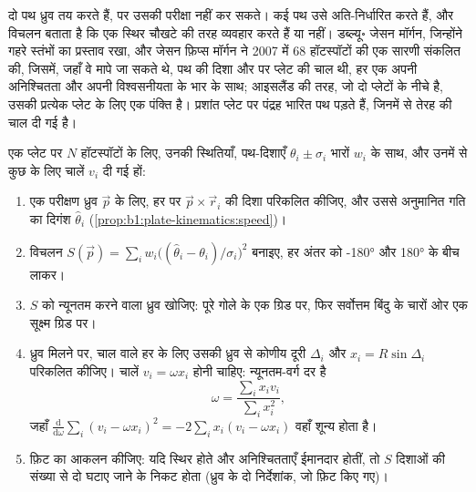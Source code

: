 दो पथ ध्रुव तय करते हैं, पर उसकी परीक्षा नहीं कर सकते। कई पथ उसे अति-निर्धारित करते हैं, और विचलन बताता है कि  एक स्थिर चौखटे की तरह व्यवहार करते हैं या नहीं। डब्ल्यू॰ जेसन मॉर्गन, जिन्होंने गहरे स्तंभों का प्रस्ताव रखा, और जेसन फ़िप्स मॉर्गन ने 2007 में 68 हॉटस्पॉटों की एक सारणी संकलित की, जिसमें, जहाँ वे मापे जा सकते थे, पथ की दिशा और  पर प्लेट की चाल थी, हर एक अपनी अनिश्चितता और अपनी विश्वसनीयता के भार के साथ; आइसलैंड की तरह, जो दो प्लेटों के नीचे है, उसकी प्रत्येक प्लेट के लिए एक पंक्ति है। प्रशांत प्लेट पर पंद्रह भारित पथ पड़ते हैं, जिनमें से तेरह की चाल दी गई है।

\begin{method}[हॉटस्पॉट-पथों से यूलर ध्रुव और दर का अनुमान]
\label{met:b1:hotspots:pole-fit}
एक प्लेट पर $N$ हॉटस्पॉटों के लिए, उनकी स्थितियाँ, पथ-दिशाएँ $\theta_i \pm \sigma_i$ भारों $w_i$ के साथ, और उनमें से कुछ के लिए चालें $v_i$ दी गई हों:
\begin{enumerate}
  \item एक परीक्षण ध्रुव $\vec p$ के लिए, हर  पर $\vec p\times\vec r_i$ की दिशा परिकलित कीजिए, और उससे अनुमानित गति का दिगंश $\hat\theta_i$ (\cref{prop:b1:plate-kinematics:speed})।
  \item विचलन $S(\vec p) = \sum_i w_i\bigl((\hat\theta_i -
        \theta_i)/\sigma_i\bigr)^2$ बनाइए, हर अंतर को \ang{-180} और \ang{180} के बीच लाकर।
  \item $S$ को न्यूनतम करने वाला ध्रुव खोजिए: पूरे गोले के एक ग्रिड पर, फिर सर्वोत्तम बिंदु के चारों ओर एक सूक्ष्म ग्रिड पर।
  \item ध्रुव मिलने पर, चाल वाले हर  के लिए उसकी ध्रुव से कोणीय दूरी $\Delta_i$ और $x_i = R\sin\Delta_i$ परिकलित कीजिए। चालें $v_i = \omega x_i$ होनी चाहिए: न्यूनतम-वर्ग दर है
        \[
          \omega = \frac{\sum_i x_i v_i}{\sum_i x_i^2},
        \]
        जहाँ $\frac{\mathrm d}{\mathrm d\omega}\sum_i (v_i - \omega x_i)^2 =
        -2\sum_i x_i(v_i - \omega x_i)$ वहाँ शून्य होता है।
  \item फ़िट का आकलन कीजिए: यदि  स्थिर होते और अनिश्चितताएँ ईमानदार होतीं, तो $S$ दिशाओं की संख्या से दो घटाए जाने के निकट होता (ध्रुव के दो निर्देशांक, जो फ़िट किए गए)।
\end{enumerate}
\end{method}


